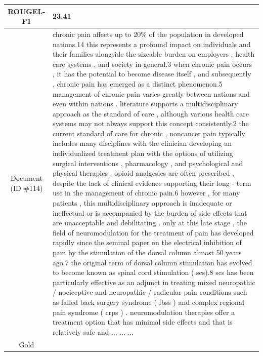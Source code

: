\begin{table}[bth!]
\begin{tabular}{c|p{}}
ROUGEL-F1 & 
23.41
\\ \hline
\makecell{Document\\(ID \#114)} & 
chronic pain affects up to 20\% of the population in developed nations.14 this represents a profound impact on individuals and their families alongside the sizeable burden on employers , health care systems , and society in general.3 when chronic pain occurs , it has the potential to become disease itself , and subsequently , chronic pain has emerged as a distinct phenomenon.5 management of chronic pain varies greatly between nations and even within nations . literature supports a multidisciplinary approach as the standard of care , although various health care systems may not always support this concept consistently.2 the current standard of care for chronic , noncancer pain typically includes many disciplines with the clinician developing an individualized treatment plan with the options of utilizing surgical interventions , pharmacology , and psychological and physical therapies . opioid analgesics are often prescribed , despite the lack of clinical evidence supporting their long - term use in the management of chronic pain.6 however , for many patients , this multidisciplinary approach is inadequate or ineffectual or is accompanied by the burden of side effects that are unacceptable and debilitating . only at this late stage , the field of neuromodulation for the treatment of pain has developed rapidly since the seminal paper on the electrical inhibition of pain by the stimulation of the dorsal column almost 50 years ago.7 the original term of dorsal column stimulation has evolved to become known as spinal cord stimulation ( scs).8 scs has been particularly effective as an adjunct in treating mixed neuropathic / nociceptive and neuropathic / radicular pain conditions such as failed back surgery syndrome ( fbss ) and complex regional pain syndrome ( crps ) . neuromodulation therapies offer a treatment option that has minimal side effects and that is relatively safe and ... ... ... 
\\ \hline
Gold & 

\end{tabular}
\end{table}
